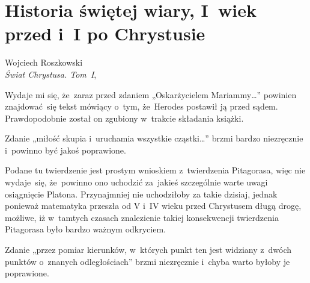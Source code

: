 \documentclass[a4paper,11pt]{article}
\begin{document}
\newpage

\section{Historia świętej wiary, I~wiek przed i~I po Chrystusie}




{ %
  Wojciech Roszkowski \\
  \textit{Świat Chrystusa. Tom~I}, \cite{RoszkowskiSwiatChrystusVolI2016}}

\vspace{0em}



\vspace{0em}


\noindent
{} Wydaje mi się, że~zaraz przed zdaniem
„Oskarżycielem Mariammy\ldots” powinien znajdować~się tekst mówiący
o~tym, że~Herodes postawił ją przed sądem. Prawdopodobnie został on
zgubiony w~trakcie składania książki.

\VerSpaceFour





\noindent
{} Zdanie „miłość skupia i~uruchamia wszystkie cząstki\ldots”
brzmi bardzo niezręcznie i~powinno być jakoś poprawione.

\VerSpaceFour





\noindent
{} Podane tu twierdzenie jest prostym wnioskiem
z~twierdzenia Pitagorasa, więc nie wydaje~się, że~powinno ono uchodzić
za~jakieś
szczególnie warte uwagi osiągnięcie Platona. Przynajmniej nie uchodziłoby
za takie dzisiaj, jednak ponieważ matematyka przeszła od V i~IV wieku przed
Chrystusem długą drogę, możliwe, iż w~tamtych czasach znalezienie takiej
konsekwencji twierdzenia Pitagorasa było bardzo ważnym odkryciem.

\VerSpaceFour





\noindent
{} Zdanie „przez pomiar kierunków, w~których punkt ten jest
widziany z~dwóch punktów o~znanych odległościach” brzmi niezręcznie i~chyba
warto byłoby je poprawione.
\end{document}
